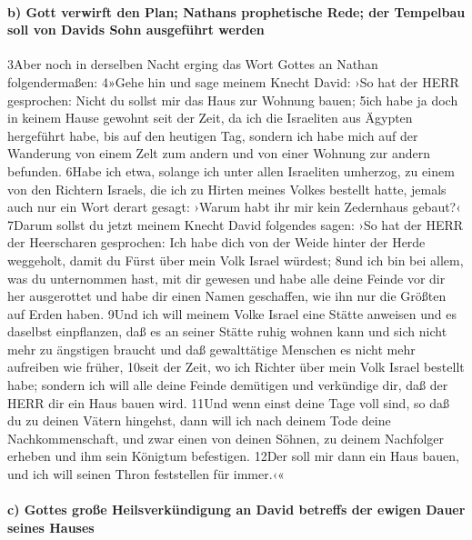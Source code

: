 \hypertarget{b-gott-verwirft-den-plan-nathans-prophetische-rede-der-tempelbau-soll-von-davids-sohn-ausgefuxfchrt-werden}{%
\paragraph{b) Gott verwirft den Plan; Nathans prophetische Rede; der
Tempelbau soll von Davids Sohn ausgeführt
werden}\label{b-gott-verwirft-den-plan-nathans-prophetische-rede-der-tempelbau-soll-von-davids-sohn-ausgefuxfchrt-werden}}

3Aber noch in derselben Nacht erging das Wort Gottes an Nathan
folgendermaßen: 4»Gehe hin und sage meinem Knecht David: ›So hat der
HERR gesprochen: Nicht du sollst mir das Haus zur Wohnung bauen; 5ich
habe ja doch in keinem Hause gewohnt seit der Zeit, da ich die
Israeliten aus Ägypten hergeführt habe, bis auf den heutigen Tag,
sondern ich habe mich auf der Wanderung von einem Zelt zum andern und
von einer Wohnung zur andern befunden. 6Habe ich etwa, solange ich unter
allen Israeliten umherzog, zu einem von den Richtern Israels, die ich zu
Hirten meines Volkes bestellt hatte, jemals auch nur ein Wort derart
gesagt: ›Warum habt ihr mir kein Zedernhaus gebaut?‹ 7Darum sollst du
jetzt meinem Knecht David folgendes sagen: ›So hat der HERR der
Heerscharen gesprochen: Ich habe dich von der Weide hinter der Herde
weggeholt, damit du Fürst über mein Volk Israel würdest; 8und ich bin
bei allem, was du unternommen hast, mit dir gewesen und habe alle deine
Feinde vor dir her ausgerottet und habe dir einen Namen geschaffen, wie
ihn nur die Größten auf Erden haben. 9Und ich will meinem Volke Israel
eine Stätte anweisen und es daselbst einpflanzen, daß es an seiner
Stätte ruhig wohnen kann und sich nicht mehr zu ängstigen braucht und
daß gewalttätige Menschen es nicht mehr aufreiben wie früher, 10seit der
Zeit, wo ich Richter über mein Volk Israel bestellt habe; sondern ich
will alle deine Feinde demütigen und verkündige dir, daß der HERR dir
ein Haus bauen wird. 11Und wenn einst deine Tage voll sind, so daß du zu
deinen Vätern hingehst, dann will ich nach deinem Tode deine
Nachkommenschaft, und zwar einen von deinen Söhnen, zu deinem Nachfolger
erheben und ihm sein Königtum befestigen. 12Der soll mir dann ein Haus
bauen, und ich will seinen Thron feststellen für immer.‹«

\hypertarget{c-gottes-grouxdfe-heilsverkuxfcndigung-an-david-betreffs-der-ewigen-dauer-seines-hauses}{%
\paragraph{c) Gottes große Heilsverkündigung an David betreffs der
ewigen Dauer seines
Hauses}\label{c-gottes-grouxdfe-heilsverkuxfcndigung-an-david-betreffs-der-ewigen-dauer-seines-hauses}}

